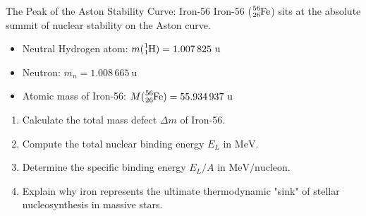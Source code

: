 \begin{exercise}{The Peak of the Aston Stability Curve: Iron-56}
Iron-56 ($\ce{^{56}_{26}Fe}$) sits at the absolute summit of nuclear stability on the Aston curve.
\begin{itemize}[itemsep=1pt]
  \item Neutral Hydrogen atom: $m(\ce{^{1}_{1}H}) = 1.007\,825\ \mathrm{u}$
  \item Neutron: $m_n = 1.008\,665\ \mathrm{u}$
  \item Atomic mass of Iron-56: $M(\ce{^{56}_{26}Fe}) = 55.934\,937\ \mathrm{u}$
\end{itemize}
\begin{enumerate}[leftmargin=1.5em,itemsep=2pt]
  \item Calculate the total mass defect $\Delta m$ of Iron-56.
  \item Compute the total nuclear binding energy $E_L$ in $\mathrm{MeV}$.
  \item Determine the specific binding energy $E_L/A$ in $\mathrm{MeV/nucleon}$.
  \item Explain why iron represents the ultimate thermodynamic "sink" of stellar nucleosynthesis in massive stars.
\end{enumerate}
\end{exercise}

\begin{tabletworkspace}[5.0cm]
\end{tabletworkspace}

